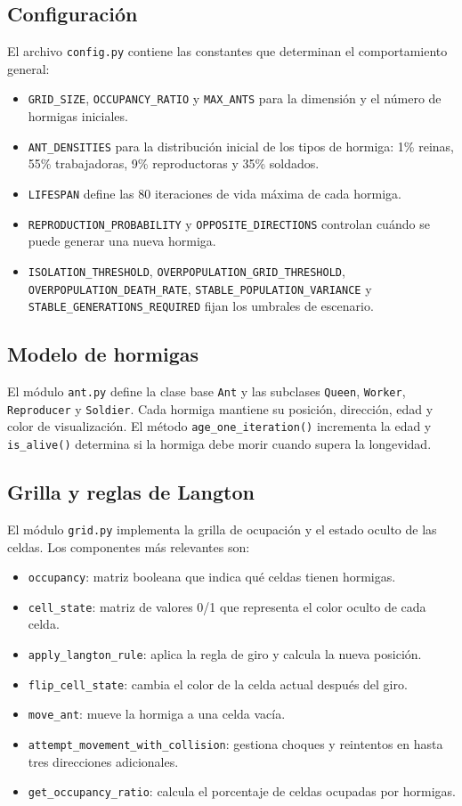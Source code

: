 \documentclass[12pt,a4paper]{article}
\begin{document}
\subsection{Configuración}
El archivo \texttt{config.py} contiene las constantes que determinan el comportamiento general:
\begin{itemize}
  \item \texttt{GRID_SIZE}, \texttt{OCCUPANCY_RATIO} y \texttt{MAX_ANTS} para la dimensión y el número de hormigas iniciales.
  \item \texttt{ANT_DENSITIES} para la distribución inicial de los tipos de hormiga: 1\% reinas, 55\% trabajadoras, 9\% reproductoras y 35\% soldados.
  \item \texttt{LIFESPAN} define las 80 iteraciones de vida máxima de cada hormiga.
  \item \texttt{REPRODUCTION_PROBABILITY} y \texttt{OPPOSITE_DIRECTIONS} controlan cuándo se puede generar una nueva hormiga.
  \item \texttt{ISOLATION_THRESHOLD}, \texttt{OVERPOPULATION_GRID_THRESHOLD}, \texttt{OVERPOPULATION_DEATH_RATE}, \texttt{STABLE_POPULATION_VARIANCE} y \texttt{STABLE_GENERATIONS_REQUIRED} fijan los umbrales de escenario.
\end{itemize}

\subsection{Modelo de hormigas}
El módulo \texttt{ant.py} define la clase base \texttt{Ant} y las subclases \texttt{Queen}, \texttt{Worker}, \texttt{Reproducer} y \texttt{Soldier}. Cada hormiga mantiene su posición, dirección, edad y color de visualización. El método \texttt{age_one_iteration()} incrementa la edad y \texttt{is_alive()} determina si la hormiga debe morir cuando supera la longevidad.

\subsection{Grilla y reglas de Langton}
El módulo \texttt{grid.py} implementa la grilla de ocupación y el estado oculto de las celdas. Los componentes más relevantes son:
\begin{itemize}
  \item \texttt{occupancy}: matriz booleana que indica qué celdas tienen hormigas.
  \item \texttt{cell_state}: matriz de valores 0/1 que representa el color oculto de cada celda.
  \item \texttt{apply_langton_rule}: aplica la regla de giro y calcula la nueva posición.
  \item \texttt{flip_cell_state}: cambia el color de la celda actual después del giro.
  \item \texttt{move_ant}: mueve la hormiga a una celda vacía.
  \item \texttt{attempt_movement_with_collision}: gestiona choques y reintentos en hasta tres direcciones adicionales.
  \item \texttt{get_occupancy_ratio}: calcula el porcentaje de celdas ocupadas por hormigas.
\end{itemize}
\end{document}
